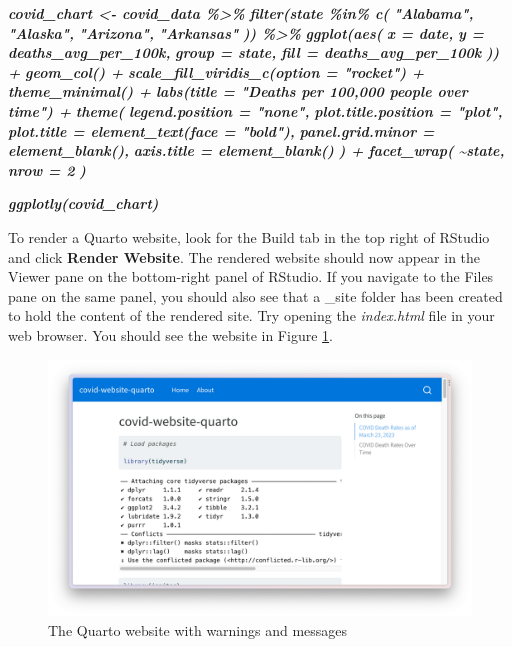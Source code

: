 \documentclass[
]{book}
\newenvironment{Shaded}{\begin{snugshade}}{\end{snugshade}}
\newcommand{\InformationTok}[1]{\textcolor[rgb]{0.56,0.35,0.01}{\textbf{\textit{#1}}}}
\begin{document}
\begin{Shaded}
\begin{Highlighting}[]
\InformationTok{covid\_chart \textless{}{-} covid\_data \%\textgreater{}\%}
\InformationTok{  filter(state \%in\% c(}
\InformationTok{    "Alabama",}
\InformationTok{    "Alaska",}
\InformationTok{    "Arizona",}
\InformationTok{    "Arkansas"}
\InformationTok{  )) \%\textgreater{}\%}
\InformationTok{  ggplot(aes(}
\InformationTok{    x = date,}
\InformationTok{    y = deaths\_avg\_per\_100k,}
\InformationTok{    group = state,}
\InformationTok{    fill = deaths\_avg\_per\_100k}
\InformationTok{  )) +}
\InformationTok{  geom\_col() +}
\InformationTok{  scale\_fill\_viridis\_c(option = "rocket") +}
\InformationTok{  theme\_minimal() +}
\InformationTok{  labs(title = "Deaths per 100,000 people over time") +}
\InformationTok{  theme(}
\InformationTok{    legend.position = "none",}
\InformationTok{    plot.title.position = "plot",}
\InformationTok{    plot.title = element\_text(face = "bold"),}
\InformationTok{    panel.grid.minor = element\_blank(),}
\InformationTok{    axis.title = element\_blank()}
\InformationTok{  ) +}
\InformationTok{  facet\_wrap(}
\InformationTok{    \textasciitilde{}state,}
\InformationTok{    nrow = 2}
\InformationTok{  )}


\InformationTok{ggplotly(covid\_chart)}
\InformationTok{\textasciigrave{}\textasciigrave{}\textasciigrave{}}
\end{Highlighting}
\end{Shaded}

To render a Quarto website, look for the Build tab in the top right of RStudio and click \textbf{Render Website}. The rendered website should now appear in the Viewer pane on the bottom-right panel of RStudio. If you navigate to the Files pane on the same panel, you should also see that a \_site folder has been created to hold the content of the rendered site. Try opening the \emph{index.html} file in your web browser. You should see the website in Figure \ref{fig:covid-website-messages}.

\begin{figure}
\includegraphics[width=1\linewidth]{assets/covid-website-messages} \caption{The Quarto website with warnings and messages}\label{fig:covid-website-messages}
\end{figure}
\end{document}
